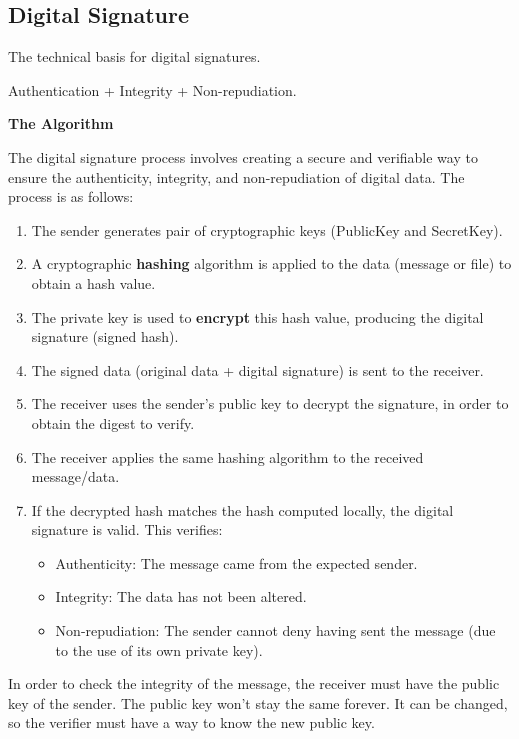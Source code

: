 \subsection{Digital Signature}
\begin{center}
    The technical basis for digital signatures.

    Authentication + Integrity + Non-repudiation.
\end{center}
\begin{center}
    \textbf{The Algorithm}
\end{center}
The digital signature process involves creating a secure and verifiable way to ensure the authenticity, integrity, and non-repudiation of digital data. The process is as follows:
\begin{enumerate}
    \item The sender generates pair of cryptographic keys (PublicKey and SecretKey).
    \item A cryptographic \textbf{hashing} algorithm is applied to the data (message or file) to obtain a hash value.
    \item The private key is used to \textbf{encrypt} this hash value, producing the digital signature (signed hash).
    \item The signed data (original data + digital signature) is sent to the receiver.
    \item The receiver uses the sender's public key to decrypt the signature, in order to obtain the digest to verify.
    \item The receiver applies the same hashing algorithm to the received message/data.
    \item If the decrypted hash matches the hash computed locally, the digital signature is valid. This verifies:
    \begin{itemize}
        \item Authenticity: The message came from the expected sender.
        \item Integrity: The data has not been altered.
        \item Non-repudiation: The sender cannot deny having sent the message (due to the use of its own private key).
    \end{itemize}
\end{enumerate}
\begin{tcolorbox}[colback=red!10!white, colframe=red!70!black, coltitle=white, title=Beware]
In order to check the integrity of the message, the receiver must have the public key of the sender. The public key won't stay the same forever. It can be changed, so the verifier must have a way to know the new public key.
\end{tcolorbox}

